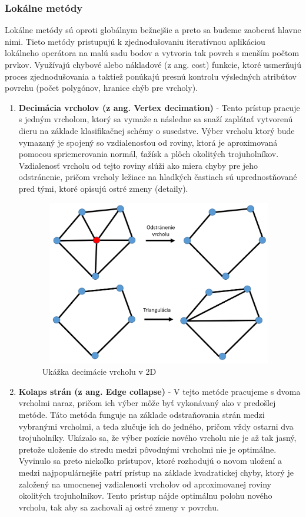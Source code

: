 \subsubsection{Lokálne metódy} \label{sec:decimation}
\noindent Lokálne metódy sú oproti globálnym bežnejšie a preto sa budeme zaoberať hlavne nimi. Tieto metódy pristupujú k zjednodušovaniu iteratívnou aplikáciou lokálneho operátora na malú sadu bodov a vytvoria tak povrch s menším počtom prvkov. Využívajú chybové alebo nákladové (z ang. cost)  funkcie, ktoré usmerňujú proces zjednodušovania a taktiež ponúkajú presnú kontrolu výsledných atribútov povrchu (počet polygónov, hranice chýb pre vrcholy). \cite{mesh_simplification}
\begin{enumerate}
    \item\textbf{Decimácia vrcholov (z ang. Vertex decimation)} - Tento prístup pracuje s jedným vrcholom, ktorý sa vymaže a následne sa snaží zaplátať vytvorenú dieru na základe klasifikačnej schémy o susedstve. Výber vrcholu ktorý bude vymazaný je spojený so  vzdialenosťou od roviny, ktorá je aproximovaná pomocou spriemerovania normál, ťažísk a plôch okolitých trojuholníkov. Vzdialenosť vrcholu od tejto roviny slúži ako miera chyby pre jeho odstránenie, pričom vrcholy ležiace na hladkých častiach sú uprednostňované pred tými, ktoré opisujú ostré zmeny (detaily). \cite{mesh_simplification}
    \begin{figure}[!htbp]
      \centering
      \includegraphics[width=10.5cm, height=7.2cm]{img/vertex_decim.png}
      \caption{Ukážka decimácie vrcholu v 2D} 
      \label{fig:vertex_decim}
    \end{figure} 
    \item\textbf{Kolaps strán (z ang. Edge collapse)} - V tejto metóde pracujeme s dvoma vrcholmi naraz, pričom ich výber môže byť vykonávaný ako v predošlej metóde. Táto metóda funguje na základe odstraňovania strán medzi vybranými vrcholmi, a teda zlučuje ich do jedného, pričom vždy ostarni dva trojuholníky. Ukázalo sa, že výber pozície nového vrcholu nie je až tak jasný, pretože uloženie do stredu medzi pôvodnými vrcholmi nie je optimálne. Vyvinulo sa preto niekoľko prístupov, ktoré rozhodujú o novom uložení a medzi najpopulárnejšie patrí  prístup na základe kvadratickej chyby, ktorý je založený na umocnenej vzdialenosti vrcholov od aproximovanej roviny okolitých trojuholníkov. Tento prístup nájde optimálnu polohu nového vrcholu, tak aby sa zachovali aj ostré zmeny v povrchu.

\end{enumerate}

